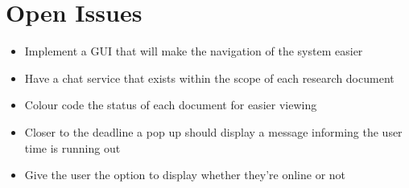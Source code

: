 \documentclass[11pt]{article}
\begin{document}
	\section{Open Issues}
		\begin{itemize}
			\item Implement a GUI that will make the navigation of the system easier
			\item Have a chat service that exists within the scope of each research document
			\item Colour code the status of each document for easier viewing
			\item Closer to the deadline a pop up should display a message informing the user time is running out
			\item Give the user the option to display whether they're online or not
		\end{itemize}	
		
	\newpage
	
	{}
	
\end{document}
